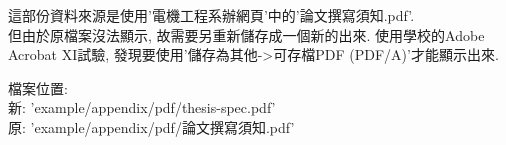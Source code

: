 
這部份資料來源是使用'電機工程系辦網頁'中的'論文撰寫須知.pdf'\cite{web:ncku:thesis-need-to-know}.\\

但由於原檔案沒法顯示, 故需要另重新儲存成一個新的出來. 使用學校的Adobe Acrobat XI試驗, 發現要使用'儲存為其他->可存檔PDF (PDF/A)'才能顯示出來.\\


\noindent 檔案位置:\\
\noindent 新: 'example/appendix/pdf/thesis-spec.pdf'\\
\noindent 原: 'example/appendix/pdf/論文撰寫須知.pdf'\\



\EndChapter

